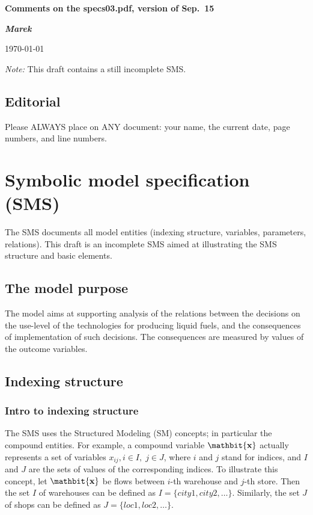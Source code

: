 \documentclass[a4paper,12pt]{article}
\def\vv#1{\ensuremath{\mathbit{\bf #1}}}
\begin{document}
\thispagestyle{empty}
\pagestyle{plain}
\centerline{\Large\bf Comments on the specs03.pdf, version of Sep.~15}
\bigskip

\centerline{\large\bf {\em Marek}}
\bigskip

\centerline{\sc \today}

\bigskip
\bigskip

\linenumbers

{\em Note:} This draft contains a still incomplete SMS.

\subsection*{Editorial}
Please ALWAYS place on ANY document: your name, the current date, page
numbers, and line numbers.

\section{Symbolic model specification (SMS)}
The SMS documents all model entities (indexing structure, variables,
parameters, relations).
This draft is an incomplete SMS aimed at illustrating the SMS structure
and basic elements.

\subsection{The model purpose}
The model aims at supporting analysis of the relations between the decisions
on the use-level of the technologies for producing liquid fuels, and the consequences
of implementation of such decisions.
The consequences are measured by values of the outcome variables.

\subsection{Indexing structure}
\subsubsection{Intro to indexing structure}
The SMS uses the Structured Modeling (SM) concepts; in particular the
compound entities.
For example, a compound variable $\vv{x}$ actually represents a set of variables
$x_{ij}, i \in I,\; j \in J$, where $i$ and $j$ stand for indices, and $I$ and
$J$ are the sets of values of the corresponding indices.
To illustrate this concept, let $\vv{x}$ be flows between $i$-th warehouse
and $j$-th store.
Then the set $I$ of warehouses can be defined as $I = \{city1, city2, \dots\}$.
Similarly, the set $J$ of shops can be defined as $J = \{loc1, loc2, \dots\}$.
\end{document}
